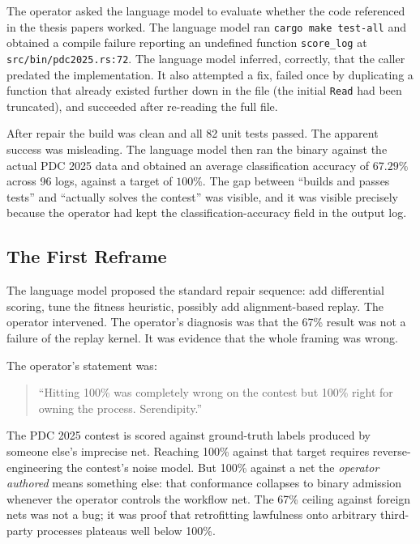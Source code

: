 \documentclass[11pt,letterpaper]{article}
\begin{document}
The operator asked the language model to evaluate whether the code referenced in the thesis papers worked. The language model ran \texttt{cargo make test-all} and obtained a compile failure reporting an undefined function \texttt{score\_log} at \texttt{src/bin/pdc2025.rs:72}. The language model inferred, correctly, that the caller predated the implementation. It also attempted a fix, failed once by duplicating a function that already existed further down in the file (the initial \texttt{Read} had been truncated), and succeeded after re-reading the full file.

After repair the build was clean and all 82 unit tests passed. The apparent success was misleading. The language model then ran the binary against the actual PDC 2025 data and obtained an average classification accuracy of \( 67.29\% \) across 96 logs, against a target of \( 100\% \). The gap between ``builds and passes tests'' and ``actually solves the contest'' was visible, and it was visible precisely because the operator had kept the classification-accuracy field in the output log.

\subsection{The First Reframe}

The language model proposed the standard repair sequence: add differential scoring, tune the fitness heuristic, possibly add alignment-based replay. The operator intervened. The operator's diagnosis was that the 67\% result was not a failure of the replay kernel. It was evidence that the whole framing was wrong.

The operator's statement was:

\begin{quote}
``Hitting 100\% was completely wrong on the contest but 100\% right for owning the process. Serendipity.''
\end{quote}

The PDC 2025 contest is scored against ground-truth labels produced by someone else's imprecise net. Reaching 100\% against that target requires reverse-engineering the contest's noise model. But 100\% against a net the \emph{operator authored} means something else: that conformance collapses to binary admission whenever the operator controls the workflow net. The 67\% ceiling against foreign nets was not a bug; it was proof that retrofitting lawfulness onto arbitrary third-party processes plateaus well below 100\%.
\end{document}

